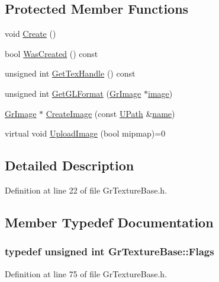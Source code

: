 \begin{CompactItemize}
\subsection*{Protected Member Functions}
\begin{CompactItemize}
\item 
void \hyperlink{class_gr_texture_base_c350ea2f901475fc6cd8bfca56bc5b19}{Create} ()
\item 
bool \hyperlink{class_gr_texture_base_2c2c9ce5410067d710b26d4dfe37721d}{WasCreated} () const 
\item 
unsigned int \hyperlink{class_gr_texture_base_8be868ce1a1917e37ea1e72d2436a9b2}{GetTexHandle} () const 
\item 
unsigned int \hyperlink{class_gr_texture_base_ac63f0e0d108d3fa26b07222f2655f7a}{GetGLFormat} (\hyperlink{class_gr_image}{GrImage} $\ast$\hyperlink{glext__bak_8h_8943555672bc4b8056204eb92329cafa}{image})
\item 
\hyperlink{class_gr_image}{GrImage} $\ast$ \hyperlink{class_gr_texture_base_dcc745602c8ec90a262a1bd9a81556ce}{CreateImage} (const \hyperlink{class_u_path}{UPath} \&\hyperlink{glext__bak_8h_bb62efe59ccdd153ce42e1a418352209}{name})
\item 
virtual void \hyperlink{class_gr_texture_base_210a2e21f20c0c9da855315c72319cff}{UploadImage} (bool mipmap)=0
\end{CompactItemize}


\subsection{Detailed Description}


Definition at line 22 of file GrTextureBase.h.

\subsection{Member Typedef Documentation}
\hypertarget{class_gr_texture_base_bee6ecbc7a70ea5f2acab8341a9696b5}{
\subsubsection[{Flags}]{\setlength{\rightskip}{0pt plus 5cm}typedef unsigned int {\bf GrTextureBase::Flags}}}
\label{class_gr_texture_base_bee6ecbc7a70ea5f2acab8341a9696b5}




Definition at line 75 of file GrTextureBase.h.


\end{CompactItemize}
